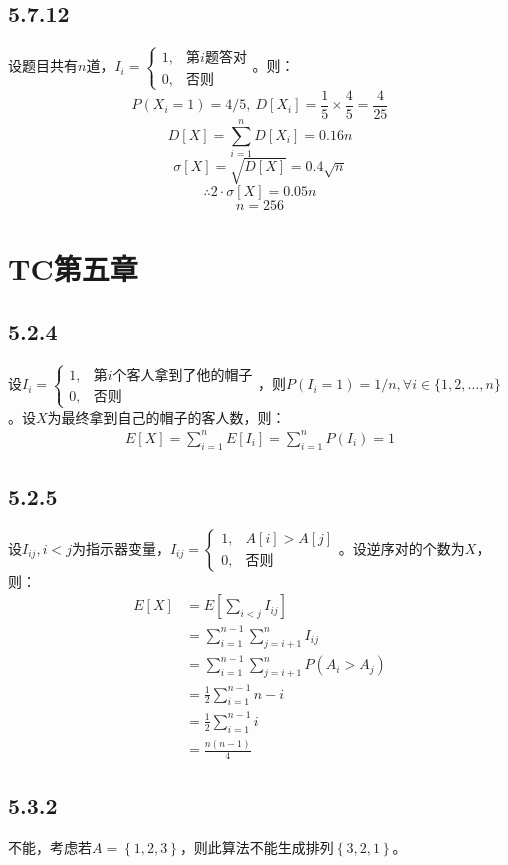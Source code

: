 \documentclass[twocolumn]{article}
\begin{document}
	\subsection*{5.7.12}
	设题目共有$n$道，$I_i=\left\{\begin{array}{cl}
	1,&\text{第$i$题答对}\\
	0,&\text{否则}
	\end{array}\right.$。则：
	$$P(X_i=1)=4/5,\ D[X_i]=\frac{1}{5}\times\frac{4}{5}=\frac{4}{25}$$
	$$D[X]=\sum_{i=1}^{n}D[X_i]=0.16n$$
	$$\sigma[X]=\sqrt{D[X]}=0.4\sqrt{n}$$
	$$\therefore 2\cdot\sigma[X]=0.05n$$
	$$n=256$$
	\section*{TC第五章}
	\subsection*{5.2.4}
	设$I_i=\left\{\begin{array}{cl}
	1,&\text{第$i$个客人拿到了他的帽子}\\
	0,&\text{否则}
	\end{array}\right.$，则$P(I_i=1)=1/n,\forall i\in\{1,2,\dots,n\}$。设$X$为最终拿到自己的帽子的客人数，则：
	\[
	\begin{aligned}
		E[X]=\sum_{i=1}^{n}E[I_i]=\sum_{i=1}^{n}P(I_i)=1
	\end{aligned}
	\]
	\subsection*{5.2.5}
	设$I_{ij},i<j$为指示器变量，$I_{ij}=\left\{\begin{array}{cl}
	1,&A[i]>A[j]\\
	0,&\text{否则}
	\end{array}\right.$。设逆序对的个数为$X$，则：
	\[
	\begin{aligned}
		E[X]&=E\left[\sum_{i<j}I_{ij}\right]\\
		&=\sum_{i=1}^{n-1}\sum_{j=i+1}^{n}I_{ij}\\
		&=\sum_{i=1}^{n-1}\sum_{j=i+1}^{n}P\left(A_i>A_j\right)\\
		&=\frac{1}{2}\sum_{i=1}^{n-1}n-i\\
		&=\frac{1}{2}\sum_{i=1}^{n-1}i\\
		&=\frac{n(n-1)}{4}
	\end{aligned}
	\]
	\subsection*{5.3.2}
	不能，考虑若$A=\left\{1,2,3\right\}$，则此算法不能生成排列$\left\{3,2,1\right\}$。
\end{document}
